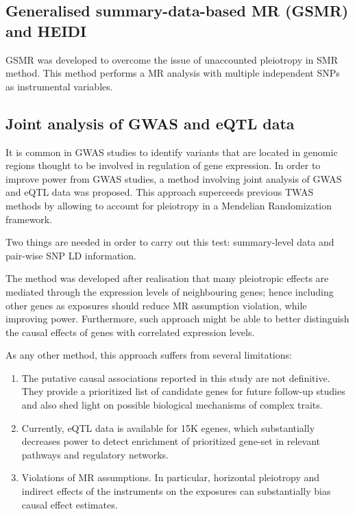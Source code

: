 \documentclass[
]{book}
\begin{document}
\hypertarget{generalised-summary-data-based-mr-gsmr-and-heidi}{%
\subsection{Generalised summary-data-based MR (GSMR) and HEIDI}\label{generalised-summary-data-based-mr-gsmr-and-heidi}}

GSMR was developed to overcome the issue of unaccounted pleiotropy in SMR method. This method performs a MR analysis with multiple independent SNPs as instrumental variables.

\hypertarget{joint-analysis-of-gwas-and-eqtl-data}{%
\subsection{Joint analysis of GWAS and eQTL data}\label{joint-analysis-of-gwas-and-eqtl-data}}

It is common in GWAS studies to identify variants that are located in genomic regions thought to be involved in regulation of gene expression. In order to improve power from GWAS studies, a method involving joint analysis of GWAS and eQTL data was proposed. This approach superceeds previous TWAS methods by allowing to account for pleiotropy in a Mendelian Randomization framework.

Two things are needed in order to carry out this test: summary-level data and pair-wise SNP LD information.

The method was developed after realisation that many pleiotropic effects are mediated through the expression levels of neighbouring genes; hence including other genes as exposures should reduce MR assumption violation, while improving power. Furthermore, such approach might be able to better distinguish the causal effects of genes with correlated expression levels.

As any other method, this approach suffers from several limitations:

\begin{enumerate}
\def\labelenumi{\arabic{enumi})}
\item
  The putative causal associations reported in this study are not definitive. They provide a prioritized list of candidate genes for future follow-up studies and also shed light on possible biological mechanisms of complex traits.
\item
  Currently, eQTL data is available for 15K egenes, which substantially decreases power to detect enrichment of prioritized gene-set in relevant pathways and regulatory networks.
\item
  Violations of MR assumptions. In particular, horizontal pleiotropy and indirect effects of the instruments on the exposures can substantially bias causal effect estimates.
\end{enumerate}
\end{document}
